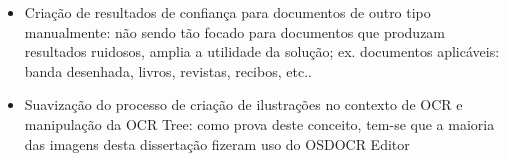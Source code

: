 \begin{itemize}
	\item Criação de resultados de confiança para documentos de outro tipo manualmente: não sendo tão focado para documentos que produzam resultados ruidosos, amplia a utilidade da solução; ex. documentos aplicáveis: banda desenhada, livros, revistas, recibos, etc..
	
	\item Suavização do processo de criação de ilustrações no contexto de OCR e manipulação da OCR Tree: como prova deste conceito, tem-se que a maioria das imagens desta dissertação fizeram uso do OSDOCR Editor
\end{itemize}

